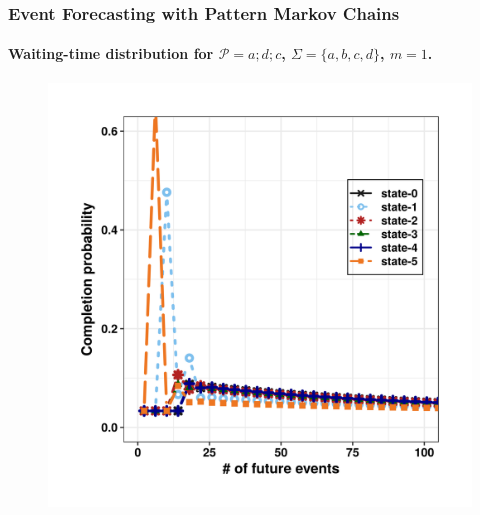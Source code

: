 \frame
{
	\frametitle{Event Forecasting with Pattern Markov
		Chains}
	\framesubtitle{Waiting-time distribution for
		$\mathcal{P}=a ; d ; c$, $\Sigma=\{a,b,c,d\}$, $m=1$.}
	\begin{figure}[]
		\begin{centering}
			\center
			\includegraphics[width=.9\textwidth,height=.8\textheight]{../chapters/figures/new_wt.png}
			
			
			
		\end{centering}
	\end{figure}
	
	
}

